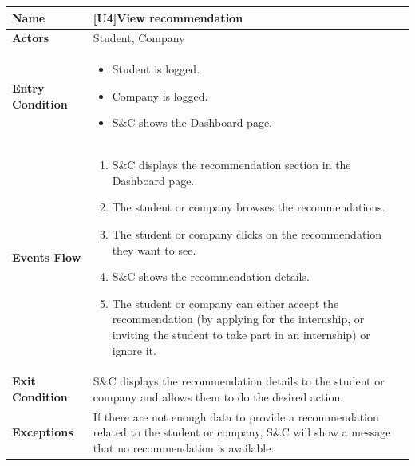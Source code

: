 \begin{center}
    \begin{tabular}{|p{9em}|p{27em}|}
        \hline
        \rowcolor{bluepoli!40} %
        \textbf{Name} & \textbf{[U4]View recommendation} \\
        \hline
        \textbf{Actors} & Student, Company \\
        \hline
        \textbf{Entry Condition} & 
        \begin{itemize}
            \item Student is logged.
            \item Company is logged.
            \item S\&C shows the Dashboard page.
        \end{itemize} \\
        \hline
        \textbf{Events Flow} & 
        \begin{enumerate}
            \item S\&C displays the recommendation section in the Dashboard page.
            \item The student or company browses the recommendations.
            \item The student or company clicks on the recommendation they want to see.
            \item S\&C shows the recommendation details.
            \item The student or company can either accept the recommendation (by applying for the internship, or inviting the 
            student to take part in an internship) or ignore it.
        \end{enumerate} \\
        \hline
        \textbf{Exit Condition} & 
        S\&C displays the recommendation details to the student or company and allows them to do the desired action. \\
        \hline
        \textbf{Exceptions} & 
        If there are not enough data to provide a recommendation related to the student or company, S\&C will show a message
        that no recommendation is available. \\
        \hline
    \end{tabular}
\end{center}

